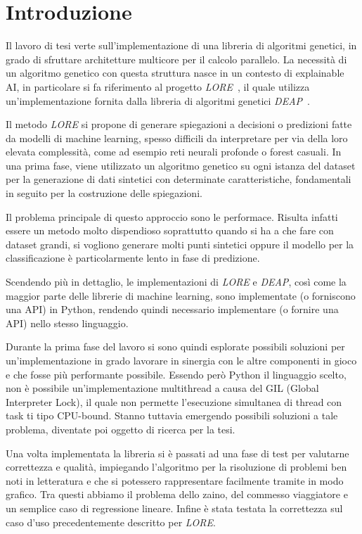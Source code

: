 \chapter*{Introduzione}

Il lavoro di tesi verte sull'implementazione di una libreria di algoritmi
genetici, in grado di sfruttare architetture multicore per il calcolo parallelo.
La necessità di un algoritmo genetico con questa struttura nasce in un contesto
di explainable AI, in particolare si fa riferimento al progetto
\textit{LORE}~\cite{guidotti2018LORE}, il quale utilizza un'implementazione
fornita dalla libreria di algoritmi genetici \textit{DEAP}~\cite{fortin2012DEAP}.

Il metodo \textit{LORE} si propone di generare spiegazioni a decisioni o
predizioni fatte da modelli di machine learning, spesso difficili da
interpretare per via della loro elevata complessità, come ad esempio reti
neurali profonde o forest casuali. In una prima fase, viene utilizzato un
algoritmo genetico su ogni istanza del dataset per la generazione di dati
sintetici con determinate caratteristiche, fondamentali in seguito per la
costruzione delle spiegazioni.

Il problema principale di questo approccio sono le performace. Risulta infatti
essere un metodo molto dispendioso soprattutto quando si ha a che fare con
dataset grandi, si vogliono generare molti punti sintetici oppure il modello
per la classificazione è particolarmente lento in fase di predizione.

Scendendo più in dettaglio, le implementazioni di \textit{LORE} e \textit{DEAP},
così come la maggior parte delle librerie di machine learning, sono
implementate (o forniscono una API) in Python, rendendo quindi necessario
implementare (o fornire una API) nello stesso linguaggio.

Durante la prima fase del lavoro si sono quindi esplorate possibili soluzioni
per un'implementazione in grado lavorare in sinergia con le altre componenti in
gioco e che fosse più performante possibile. Essendo però Python il linguaggio
scelto, non è possibile un'implementazione multithread a causa del GIL (Global
Interpreter Lock), il quale non permette l'esecuzione simultanea di thread con
task ti tipo CPU-bound. Stanno tuttavia emergendo possibili soluzioni a tale
problema, diventate poi oggetto di ricerca per la tesi.

Una volta implementata la libreria si è passati ad una fase di test per
valutarne correttezza e qualità, impiegando l'algoritmo per la risoluzione di
problemi ben noti in letteratura e che si potessero rappresentare facilmente
tramite in modo grafico. Tra questi abbiamo il problema dello zaino, del
commesso viaggiatore e un semplice caso di regressione lineare. Infine è stata
testata la correttezza sul caso d'uso precedentemente descritto per \textit{LORE}.


